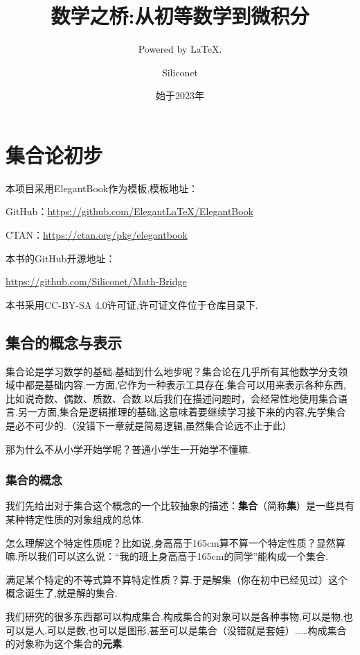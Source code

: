 \documentclass[lang=cn,math=cm,chinesefont=nofont,11pt,scheme=chinese,twocol]{elegantbook}
\title{数学之桥:从初等数学到微积分}
\subtitle{Powered by \LaTeX.}
\author{Siliconet}
\date{始于2023年}
\begin{document}
\maketitle
\frontmatter

\tableofcontents

\mainmatter

\chapter{集合论初步}

本项目采用ElegantBook作为模板,模板地址：

GitHub：\href{https://github.com/ElegantLaTeX/ElegantBook}{https://github.com/ElegantLaTeX/ElegantBook}

CTAN：\href{https://ctan.org/pkg/elegantbook}{https://ctan.org/pkg/elegantbook}

本书的GitHub开源地址：

\href{https://github.com/Siliconet/Math-Bridge}{https://github.com/Siliconet/Math-Bridge}

本书采用CC-BY-SA 4.0许可证,许可证文件位于仓库目录下.

\section{集合的概念与表示}
集合论是学习数学的基础.基础到什么地步呢？集合论在几乎所有其他数学分支领域中都是基础内容.一方面,它作为一种表示工具存在.集合可以用来表示各种东西,比如说奇数、偶数、质数、合数.以后我们在描述问题时，会经常性地使用集合语言.另一方面,集合是逻辑推理的基础,这意味着要继续学习接下来的内容,先学集合是必不可少的.（没错下一章就是简易逻辑,虽然集合论远不止于此）

那为什么不从小学开始学呢？普通小学生一开始学不懂嘛.

\subsection{集合的概念}

我们先给出对于集合这个概念的一个比较抽象的描述：\textbf{集合}（简称\textbf{集}）是一些具有某种特定性质的对象组成的总体.

怎么理解这个特定性质呢？比如说,身高高于165cm算不算一个特定性质？显然算嘛.所以我们可以这么说：“我的班上身高高于165cm的同学”能构成一个集合.

满足某个特定的不等式算不算特定性质？算.于是解集（你在初中已经见过）这个概念诞生了,就是解的集合.

我们研究的很多东西都可以构成集合.构成集合的对象可以是各种事物,可以是物,也可以是人,可以是数,也可以是图形,甚至可以是集合（没错就是套娃）……构成集合的对象称为这个集合的\textbf{元素}.
\end{document}
